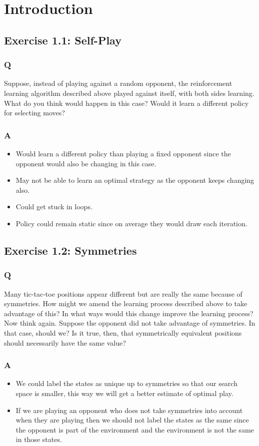 \section{Introduction}
\subsection{Exercise 1.1: Self-Play}
\subsubsection{Q}
Suppose, instead of playing against a random opponent, the reinforcement learning algorithm described above played against itself, with both sides learning. What do you think would happen in this case? Would it learn a different policy for selecting moves?

\subsubsection{A}
\begin{itemize}
    \item Would learn a different policy than playing a fixed opponent since the opponent would also be changing in this case.
    \item May not be able to learn an optimal strategy as the opponent keeps changing also.
    \item Could get stuck in loops.
    \item Policy could remain static since on average they would draw each iteration.
\end{itemize}

\subsection{Exercise 1.2: Symmetries}
\subsubsection{Q}
Many tic-tac-toe positions appear different but are really the same because of symmetries. How might we amend the learning process described above to take advantage of this? In what ways would this change improve the learning process? Now think again. Suppose the opponent did not take advantage of symmetries. In that case, should we? Is it true, then, that symmetrically equivalent positions should necessarily have the same value?

\subsubsection{A}
\begin{itemize}
    \item We could label the states as unique up to symmetries so that our search space is smaller, this way we will get a better estimate of optimal play.
    \item If we are playing an opponent who does not take symmetries into account when they are playing then we should not label the states as the same since the opponent is part of the environment and the environment is not the same in those states.
\end{itemize}

